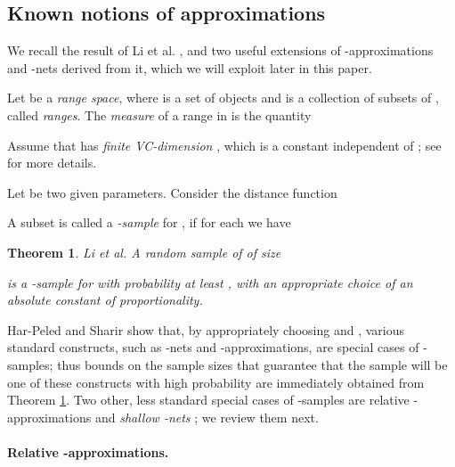 \documentclass[11pt]{article}
\newtheorem{theorem}{Theorem}[section]
\begin{document}
\subsection{Known notions of approximations} \label{subsection_approximations}
We recall the result of Li et al. \cite{lls01}, and two useful extensions of -approximations and -nets derived from it, which we will exploit later in this paper.

Let  be a \emph{range space}, where  is a set of  objects and  is a collection of subsets of , called \emph{ranges}. The \emph{measure} of a range  in  is the quantity

Assume that  has {\em finite VC-dimension} , which is a constant independent of ; see \cite{mat02} for more details.

Let  be two given parameters. Consider the distance function

A subset  is called a {\em -sample} for , if for each  we have


\begin{theorem} \label{thm_nu_alpha_sample} {\emph{Li et al.} \bf \cite{lls01}}
A random sample of  of size

is a -sample for  with probability at least , with an appropriate choice of an absolute constant of proportionality.
\end{theorem}

Har-Peled and Sharir \cite{hs11} show that, by appropriately choosing  and , various standard constructs, such as -nets and -approximations, are special cases of -samples; thus bounds on the sample sizes that guarantee that the sample will be one of these constructs with high probability are immediately obtained from Theorem \ref{thm_nu_alpha_sample}. Two other, less standard special cases of -samples are relative -approximations \cite{hs11} and {\em shallow -nets} \cite{shsh11}; we review them next.

\paragraph{Relative -approximations.}
\end{document}
